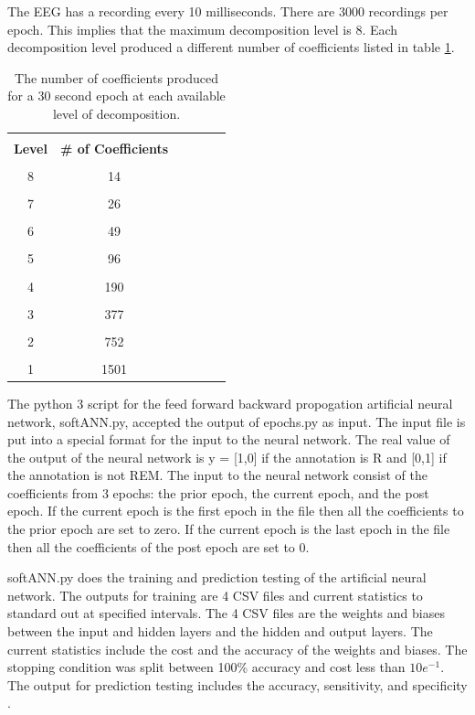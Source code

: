 \documentclass[12pt, oneside]{book}
\begin{document}
The EEG has a recording every 10 milliseconds. There are 3000 recordings per epoch. This implies that the maximum decomposition level is 8. Each decomposition level produced a different number of coefficients listed in table \ref{tab:coeff}.

\begin{table}[H]
	{\hspace{0cm}
		\begin{tabular}{|c|c|c|c|c|c|}
			\hline \\ [-1.5ex]
			\textbf{Level} & \textbf{\# of Coefficients} \\
			\hline \\ [-1.5ex]
			8&14 \\
			\hline \\ [-1.5ex]
			7&26 \\
			\hline \\ [-1.5ex]
			6&49 \\
			\hline \\ [-1.5ex]
			5&96 \\
			\hline \\ [-1.5ex]
			4&190 \\
			\hline \\ [-1.5ex]
			3&377 \\
			\hline \\ [-1.5ex]
			2&752 \\
			\hline \\ [-1.5ex]
			1&1501 \\
			\hline
		\end{tabular}
	} 
	\caption{The number of coefficients produced for a 30 second epoch at each available level of decomposition.}
	\label{tab:coeff}
\end{table}

The python 3 script for the feed forward backward propogation artificial neural network, softANN.py, accepted the output of epochs.py as input. The input file is put into a special format for the input to the neural network. The real value of the output of the neural network is y = [1,0] if the annotation is R and [0,1] if the annotation is not REM. The input to the neural network consist of the coefficients from 3 epochs: the prior epoch, the current epoch, and the post epoch. If the current epoch is the first epoch in the file then all the coefficients to the prior epoch are set to zero. If the current epoch is the last epoch in the file then all the coefficients of the post epoch are set to 0. 

softANN.py does the training and prediction testing of the artificial neural network. The outputs for training are 4 CSV files and current statistics to standard out at specified intervals. The 4 CSV files are the weights and biases between the input and hidden layers and the hidden and output layers. The current statistics include the cost and the accuracy of the weights and biases. The stopping condition was split between 100\% accuracy and cost less than \(10e^{-1}\). The output for prediction testing includes the accuracy, sensitivity, and specificity \cite{baratloo_part_2015}.
\end{document}
